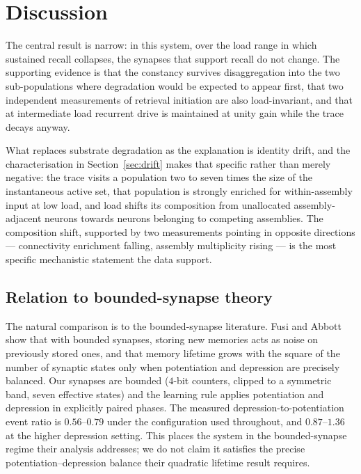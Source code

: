 \documentclass[10pt,twocolumn,a4paper]{article}
\begin{document}
\section{Discussion}
\label{sec:discussion}

The central result is narrow: in this system, over the load range in which sustained recall
collapses, the synapses that support recall do not change. The supporting evidence is that
the constancy survives disaggregation into the two sub-populations where degradation would
be expected to appear first, that two independent measurements of retrieval initiation are
also load-invariant, and that at intermediate load recurrent drive is maintained at unity
gain while the trace decays anyway.

What replaces substrate degradation as the explanation is identity drift, and the
characterisation in Section~\ref{sec:drift} makes that specific rather than merely
negative: the trace visits a population two to seven times the size of the instantaneous
active set, that population is strongly enriched for within-assembly input at low load, and
load shifts its composition from unallocated assembly-adjacent neurons towards neurons
belonging to competing assemblies. The composition shift, supported by two measurements
pointing in opposite directions --- connectivity enrichment falling, assembly multiplicity
rising --- is the most specific mechanistic statement the data support.

\subsection{Relation to bounded-synapse theory}

The natural comparison is to the bounded-synapse literature. Fusi and Abbott
\cite{fusiabbott2007} show that with bounded synapses, storing new memories acts as noise
on previously stored ones, and that memory lifetime grows with the square of the number of
synaptic states only when potentiation and depression are precisely balanced. Our synapses
are bounded ($4$-bit counters, clipped to a symmetric band, seven effective states) and the
learning rule applies potentiation and depression in explicitly paired phases. The measured
depression-to-potentiation event ratio is $0.56$--$0.79$ under the configuration used
throughout, and $0.87$--$1.36$ at the higher depression setting. This places the system in
the bounded-synapse regime their analysis addresses; we do not claim it satisfies the
precise potentiation--depression balance their quadratic lifetime result requires.
\end{document}
